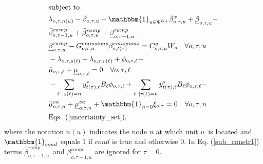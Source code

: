 \documentclass[final]{IEEEtran}
\begin{document}
\begin{align}
&\text{subject to} \nonumber \\
&\lambda_{o, \tau, n(u)} - \bar{\beta}_{o, \tau, u} - \mathbbm{1}_{u \in \Psi^{G+}} \bar{\beta}^x_{o, \tau, u} + \underline{\beta}_{o, \tau, u} - \nonumber \\
&\bar{\beta}_{o, \tau - 1, u}^{ramp} + \bar{\beta}_{o, \tau, u}^{ramp} + \underline{\beta}_{o, \tau - 1, u}^{ramp} - \nonumber \\
&\label{sub_constr1}\underline{\beta}_{o, \tau, u}^{ramp} - G_{o, \tau, u}^{emissions} \beta_{o, t(\tau)}^{emissions} = C^g_{o, \tau, u}  W_o \quad \forall o, \tau, u \\
&-\lambda_{o, \tau, s(\ell)} + \lambda_{o, \tau, r(\ell)} + \phi_{o, \tau, \ell} - \nonumber \\
&\bar{\mu}_{o, \tau, \ell} + \underline{\mu}_{o, \tau, \ell} = 0 \quad \forall o, \tau, \ell \\
&-\sum\limits_{\ell | s(\ell) = n} y_{t(\tau), \ell}^* B_\ell \phi_{o, \tau, \ell} + \sum\limits_{\ell | r(\ell) = n} y_{t(\tau), \ell}^* B_\ell \phi_{o, \tau, \ell} - \nonumber \\
&\bar{\mu}^{va}_{o, \tau, n} + \underline{\mu}^{va}_{o, \tau, n} + \mathbbm{1}_{n = 0} \xi_{o, \tau} = 0 \quad \forall o, \tau, n \\
&\text{Eqs. } (\ref{uncertainty_set}),
\end{align}
where the notation $n(u)$ indicates the node $n$ at which unit $u$ is located and $\mathbbm{1}_{cond}$ equals 1 if $cond$ is true and otherwise 0. In Eq. (\ref{sub_constr1}) terms $\bar{\beta}_{o, \tau - 1, u}^{ramp}$ and $\underline{\beta}_{o, \tau - 1, u}^{ramp}$ are ignored for $\tau = 0$.
\end{document}
